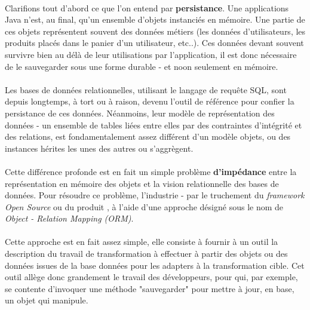{  \paragraph{} Clarifions tout d'abord ce que l'on entend par \textbf{persistance}. Une applications
  Java n'est, au final, qu'un ensemble d'objets instanciés en mémoire. Une partie de ces objets
  représentent souvent des données métiers (les données d'utilisateurs, les produits placés dans le
  panier d'un utilisateur, etc..). Ces données devant souvent survivre bien au délà de leur
  utilisations par l'application, il est donc nécessaire de le sauvegarder sous une forme durable -
  et noon seulement en mémoire.

  \paragraph{} Les bases de données relationnelles, utilisant le langage de requête SQL, sont depuis
  longtemps, à tort ou à raison, devenu l'outil de référence pour confier la persistance de ces
  données. Néanmoins, leur modèle de représentation des données - un ensemble de tables liées entre
  elles par des contraintes d'intégrité et des relations, est fondamentalement assez différent d'un
  modèle objets, ou des instances hérites les unes des autres ou s'aggrègent.

  \paragraph{} Cette différence profonde est en fait un simple problème \textbf{d'impédance} entre
  la représentation en mémoire des objets et la vision relationnelle des bases de données. Pour
  résoudre ce problème, l'industrie - par le truchement du \textit{framework Open Source}
   ou du produit , à l'aide d'une approche désigné sous
  le nom de \textit{Object - Relation Mapping (ORM)}.

  \paragraph{} Cette approche est en fait assez simple, elle consiste à fournir à un outil la
  description du travail de transformation à effectuer à partir des objets ou des données issues de
  la base données pour les adapters à la transformation cible. Cet outil allège donc grandement le
  travail des développeurs, pour qui, par exemple, se contente d'invoquer une méthode "sauvegarder"
  pour mettre à jour, en base, un objet qui manipule.

}
